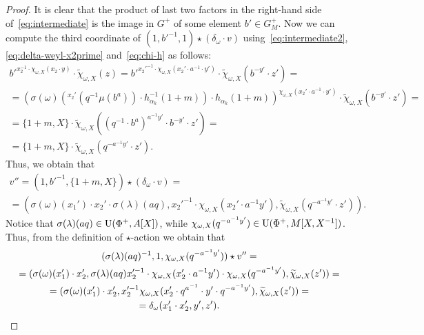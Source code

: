 \begin{proof}
It is clear that the product of last two factors in the right-hand side of~\eqref{eq:intermediate} is
 the image in $G^+$ of some element $b' \in G_M^+$.
Now we can compute the third coordinate of $(1, {b'}^{-1}, 1) \star (\delta_\omega \cdot v)$ using~\eqref{eq:intermediate2}, \eqref{eq:delta-weyl-x2prime} and~\eqref{eq:chi-h} as follows:
\begin{multline*}
 {b'}^{x_2^{-1} \cdot \chi_{\omega, X}(x_2 \cdot y) } \cdot \widetilde{\chi}_{\omega, X}(z) =
 {b'}^{{x_2'}^{-1} \cdot \chi_{\omega, X}(x_2' \cdot a^{-1} \cdot y') } \cdot \widetilde{\chi}_{\omega, X}(b^{-y'} \cdot z') = \\
 = \left(\sigma(\omega)\left( {}^{x_2'}(q^{-1} \mu(b^a)) \cdot h^{-1}_{\alpha_k}(1+m)\right) \cdot h_{\alpha_k}(1+m)\right)^{\chi_{\omega, X}(x_2' \cdot a^{-1} \cdot y')} \cdot \widetilde{\chi}_{\omega, X}(b^{-y'} \cdot z') = \\
 = \{1+m, X\} \cdot \widetilde{\chi}_{\omega, X}\left( \left( q^{-1} \cdot b^a \right)^{a^{-1}y'} \cdot b^{-y'} \cdot z' \right) = \\
 = \{1+m, X\} \cdot \widetilde{\chi}_{\omega, X}(q^{-a^{-1}y'} \cdot z').
\end{multline*}
Thus, we obtain that
\begin{multline*}
 v'' = (1, {b'}^{-1}, \{1 + m, X\}) \star (\delta_\omega \cdot v) = \\ =
  (\sigma(\omega)(x_1') \cdot x_2' \cdot \sigma(\lambda)(aq), x_2'^{-1} \cdot \chi_{\omega, X}(x_2' \cdot a^{-1} y'), \widetilde{\chi}_{\omega, X}(q^{-a^{-1}y'} \cdot z')).
\end{multline*}
Notice that $\sigma(\lambda)(aq) \in \operatorname{U}(\Phi^+, A[X])$, while $\chi_{\omega, X}(q^{-a^{-1}y'})\in \operatorname{U}(\Phi^+, M[X, X^{-1}])$.
Thus, from the definition of $\star$-action we obtain that
\begin{multline*}
 (\sigma(\lambda)(aq)^{-1}, 1, \chi_{\omega, X}(q^{-a^{-1}y'})) \star v'' = \\
 = (\sigma(\omega)(x_1') \cdot x_2', \sigma(\lambda)(aq) x_2'^{-1} \cdot \chi_{\omega, X}(x_2' \cdot a^{-1} y') \cdot \chi_{\omega, X}(q^{-a^{-1}y'}), \widetilde{\chi}_{\omega, X}(z')) = \\
 = (\sigma(\omega)(x_1') \cdot x_2', x_2'^{-1} \chi_{\omega, X}(x_2' \cdot q^{a^{-1}} \cdot y' \cdot q^{-a^{-1}y'}), \widetilde{\chi}_{\omega, X}(z')) = \\
    = \delta_\omega (x_1' \cdot x_2', y', z'). \qedhere
\end{multline*}
 \end{proof}

